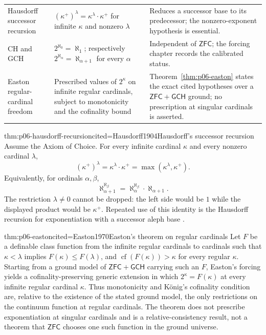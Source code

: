 \begin{longtable}{@{}p{}p{}p{}@{}}
Hausdorff successor recursion &
\((\kappa^+)^\lambda=\kappa^\lambda\cdot\kappa^+\) for infinite
\(\kappa\) and nonzero \(\lambda\) & Reduces a successor base to its
predecessor; the nonzero-exponent hypothesis is essential. \\
CH and GCH & \(2^{\aleph_0}=\aleph_1\); respectively
\(2^{\aleph_\alpha}=\aleph_{\alpha+1}\) for every \(\alpha\) & Independent
of \(\mathsf{ZFC}\); the forcing chapter records the calibrated status. \\
Easton regular-cardinal freedom & Prescribed values of \(2^\kappa\) on
infinite regular cardinals, subject to monotonicity and the cofinality bound &
Theorem~\ref{thm:p06-easton} states the exact cited hypotheses over a
\(\mathsf{ZFC}+\mathsf{GCH}\) ground; no prescription at singular cardinals is
asserted. \\
\bottomrule
\end{longtable}
\endgroup

\begin{hbtheorem}{thm:p06-hausdorff-recursion}{cited=Hausdorff1904}{Hausdorff's successor recursion}
Assume the Axiom of Choice.  For every infinite cardinal \(\kappa\) and every
nonzero cardinal \(\lambda\),
\[
  (\kappa^+)^\lambda
  =\kappa^\lambda\cdot\kappa^+
  =\max(\kappa^\lambda,\kappa^+).
\]
Equivalently, for ordinals \(\alpha,\beta\),
\[
  \aleph_{\alpha+1}^{\aleph_\beta}
  =\aleph_\alpha^{\aleph_\beta}\cdot\aleph_{\alpha+1}.
\]
The restriction \(\lambda\neq0\) cannot be dropped: the left side would be
\(1\) while the displayed product would be \(\kappa^+\).  Repeated use of
this identity is the Hausdorff recursion for exponentiation with a successor
aleph base \cite{Jech2003}.
\end{hbtheorem}

\begin{hbtheorem}{thm:p06-easton}{cited=Easton1970}{Easton's theorem on regular cardinals}
Let \(F\) be a definable class function from the infinite regular cardinals to
cardinals such that
\(\kappa<\lambda\) implies \(F(\kappa)\leq F(\lambda)\), and
\(\operatorname{cf}(F(\kappa))>\kappa\) for every regular \(\kappa\).
Starting from a ground model of \(\mathsf{ZFC}+\mathsf{GCH}\) carrying such an
\(F\), Easton's forcing yields a cofinality-preserving generic extension in
which \(2^\kappa=F(\kappa)\) at every infinite regular cardinal \(\kappa\).
Thus monotonicity and K\"onig's cofinality condition are, relative to the
existence of the stated ground model, the only restrictions on the continuum
function at regular cardinals.  The theorem does not prescribe exponentiation
at singular cardinals and is a relative-consistency result, not a theorem that
\(\mathsf{ZFC}\) chooses one such function in the ground universe.
\end{hbtheorem}


